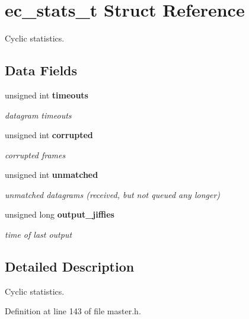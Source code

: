 \section{ec\-\_\-stats\-\_\-t \-Struct \-Reference}
\label{structec__stats__t}


\-Cyclic statistics.  


\subsection*{\-Data \-Fields}
\begin{DoxyCompactItemize}
\item 
unsigned int {\bf timeouts}\label{structec__stats__t_a955d4a4b543d39ef33e3be00b7035551}

\begin{DoxyCompactList}\small\item\em datagram timeouts \end{DoxyCompactList}\item 
unsigned int {\bf corrupted}\label{structec__stats__t_a05d3aa920802468a437e8518d84b5b4c}

\begin{DoxyCompactList}\small\item\em corrupted frames \end{DoxyCompactList}\item 
unsigned int {\bf unmatched}\label{structec__stats__t_ace86973203e2ef1838f9345f9eb2d767}

\begin{DoxyCompactList}\small\item\em unmatched datagrams (received, but not queued any longer) \end{DoxyCompactList}\item 
unsigned long {\bf output\-\_\-jiffies}\label{structec__stats__t_a1b5236e09088fa71c8bdc73b4f9de70a}

\begin{DoxyCompactList}\small\item\em time of last output \end{DoxyCompactList}\end{DoxyCompactItemize}


\subsection{\-Detailed \-Description}
\-Cyclic statistics. 

\-Definition at line 143 of file master.\-h.

